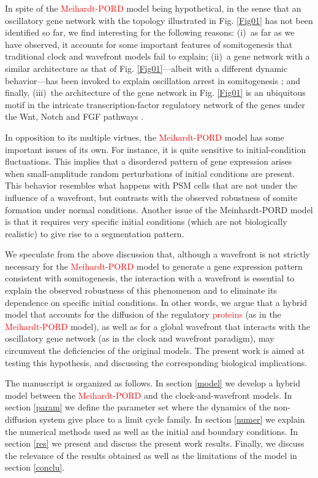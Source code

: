 \documentclass[%
 preprint,
 aip, 
 amsmath,amssymb,
]{revtex4-2}
\begin{document}
In spite of the \textcolor{red}{Meihardt-PORD} model being hypothetical, in the sense that an oscillatory gene network with the topology illustrated in Fig. \ref{Fig01} has not been identified so far, we find interesting for the following reasons: (i)~as far as we have observed, it accounts for some important features of somitogenesis that traditional clock and wavefront models fail to explain; (ii)~a gene network with a similar architecture as that of Fig. \ref{Fig01}---albeit with a different dynamic behavior---has been invoked to explain oscillation arrest in somitogenesis \cite{Santillan2008, Zavala2012}; and finally, (iii)~the architecture of the gene network in Fig. \ref{Fig01} is an ubiquitous motif in the intricate transcription-factor regulatory network of the genes under the Wnt, Notch and FGF pathways \cite{Gibb2010, Zavala2012}.
	
In opposition to its multiple virtues, the \textcolor{red}{Meihardt-PORD} model  has some important issues of its own. For instance, it is quite sensitive to initial-condition fluctuations. This implies that a disordered pattern of gene expression arises when small-amplitude random perturbations of initial conditions are present. This behavior resembles what happens with PSM cells that are not under the influence of a wavefront, but contrasts with the observed robustness of somite formation under normal conditions. Another issue of the Meinhardt-PORD model is that it requires very specific initial conditions (which are not biologically realistic) to give rise to a segmentation pattern. 

We speculate from the above discussion that, although a wavefront is not strictly necessary for the \textcolor{red}{Meihardt-PORD} model to generate a gene expression pattern consistent with somitogenesis, the interaction with a wavefront is essential to explain the observed robustness of this phenomenon and to eliminate its dependence on specific initial conditions. In other words, we argue that a hybrid model that accounts for the diffusion of the regulatory \textcolor{red}{proteins} (as in the \textcolor{red}{Meihardt-PORD} model), as well as for a global wavefront that interacts with the oscillatory gene network (as in the clock and wavefront paradigm), may circumvent the deficiencies of the original models. The present work is aimed at testing this hypothesis, and discussing the corresponding biological implications.
	
The manuscript is organized as follows. In section \ref{model} we develop a hybrid model between the \textcolor{red}{Meihardt-PORD} and the clock-and-wavefront models. In section \ref{param} we define the parameter set where the dynamics of the non-diffusion system give place to a limit cycle family. In section \ref{numer} we explain the numerical methods used as well as the initial and boundary conditions. In section \ref{res} we present and discuss the present work results. Finally, we discuss the relevance of the results obtained as well as the limitations of the model in section \ref{conclu}.
	
\end{document}
